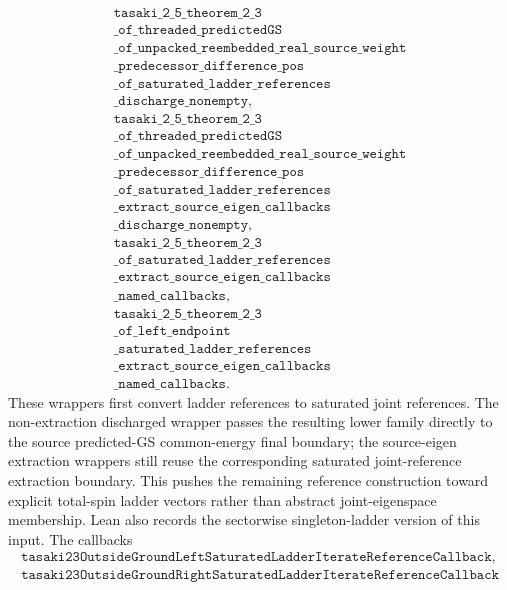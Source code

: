 \documentclass[a4paper,11pt]{article}
\begin{document}
\[
\begin{gathered}
\texttt{tasaki\_2\_5\_theorem\_2\_3}\\
\texttt{\_of\_threaded\_predictedGS}\\
\texttt{\_of\_unpacked\_reembedded\_real\_source\_weight}\\
\texttt{\_predecessor\_difference\_pos}\\
\texttt{\_of\_saturated\_ladder\_references}\\
\texttt{\_discharge\_nonempty},\\
\texttt{tasaki\_2\_5\_theorem\_2\_3}\\
\texttt{\_of\_threaded\_predictedGS}\\
\texttt{\_of\_unpacked\_reembedded\_real\_source\_weight}\\
\texttt{\_predecessor\_difference\_pos}\\
\texttt{\_of\_saturated\_ladder\_references}\\
\texttt{\_extract\_source\_eigen\_callbacks}\\
\texttt{\_discharge\_nonempty},\\
\texttt{tasaki\_2\_5\_theorem\_2\_3}\\
\texttt{\_of\_saturated\_ladder\_references}\\
\texttt{\_extract\_source\_eigen\_callbacks}\\
\texttt{\_named\_callbacks},\\
\texttt{tasaki\_2\_5\_theorem\_2\_3}\\
\texttt{\_of\_left\_endpoint}\\
\texttt{\_saturated\_ladder\_references}\\
\texttt{\_extract\_source\_eigen\_callbacks}\\
\texttt{\_named\_callbacks}.
\end{gathered}
\]
These wrappers first convert ladder references to saturated joint references.
The non-extraction discharged wrapper passes the resulting lower family
directly to the source predicted-GS common-energy final boundary; the
source-eigen extraction wrappers still reuse the corresponding saturated
joint-reference extraction boundary.
This pushes the remaining reference construction toward explicit total-spin
ladder vectors rather than abstract joint-eigenspace membership.
Lean also records the sectorwise singleton-ladder version of this input.
The callbacks
\[
\begin{gathered}
\texttt{tasaki23OutsideGroundLeftSaturatedLadderIterateReferenceCallback},\\
\texttt{tasaki23OutsideGroundRightSaturatedLadderIterateReferenceCallback}
\end{gathered}
\]
\end{document}
